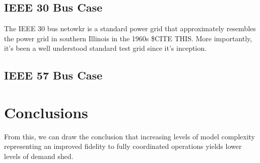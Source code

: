 \documentclass[10pt]{article}
\begin{document}
\subsection{IEEE 30 Bus Case}

The IEEE 30 bus netowkr is a standard power grid that approximately resembles the power grid in southern Illinois in the 1960s \$CITE THIS. More importantly, it's been a well understood standard test grid since it's inception.
\subsection{IEEE 57 Bus Case}

\section{\large{Conclusions}}
\label{sec:issues}
\vspace*{-12pt}

From this, we can draw the conclusion that increasing levels of model complexity representing an improved fidelity to fully coordinated operations yields lower levels of demand shed.  


\end{document}
